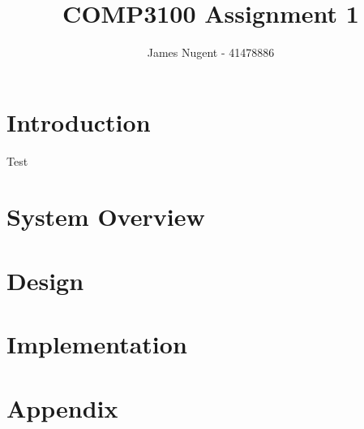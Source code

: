 \documentclass[12pt, letterpaper]{article}
\title{COMP3100 Assignment 1}
\author{James Nugent - 41478886}
\begin{document}
\maketitle
\section*{Introduction}
Test
\section*{System Overview}
\section*{Design}
\section*{Implementation}
\section*{Appendix}
\end{document}
